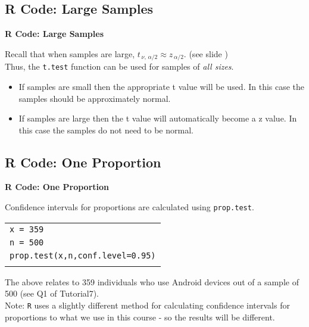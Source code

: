 \documentclass[compress]{beamer}        %
\makeatletter
\newcommand{\tcb}{\textcolor{beamer@blendedblue}}
\makeatother
\begin{document}
\subsection{R Code: Large Samples}
\begin{frame}{\bf \tcb{R Code: Large Samples}}

Recall that when samples are large, $t_{\,\nu,\,\alpha/2} \approx z_{\,\alpha/2}$. (see slide \pageref{tapproachz})\\[0.8cm]

Thus, the \texttt{t.test} function can be used for samples of \emph{all sizes}.\\[0.1cm]
\begin{itemize}\itemsep0.5cm
\item If samples are small then the appropriate t value will be used. In this case the samples should be approximately normal.
\item If samples are large then the t value will automatically become a z value. In this case the samples do not need to be normal.
\end{itemize}


\end{frame}



\subsection{R Code: One Proportion}
\begin{frame}{\bf \tcb{R Code: One Proportion}}

Confidence intervals for proportions are calculated using \texttt{prop.test}.\\[0.2cm]

\begin{tabular}{|l|}
\hline
\texttt{x = 359}\\
\texttt{n = 500}\\[0.2cm]
\texttt{prop.test(x,n,conf.level=0.95)}\\
\hline
\multicolumn{1}{c}{}\\[0.2cm]
\end{tabular}

The above relates to 359 individuals who use Android devices out of a sample of 500 (see Q1 of Tutorial7).\\[0.8cm]

Note: \texttt{R} uses a slightly different method for calculating confidence intervals for proportions to what we use in this course - so the results will be different.

\end{frame}
\end{document}

